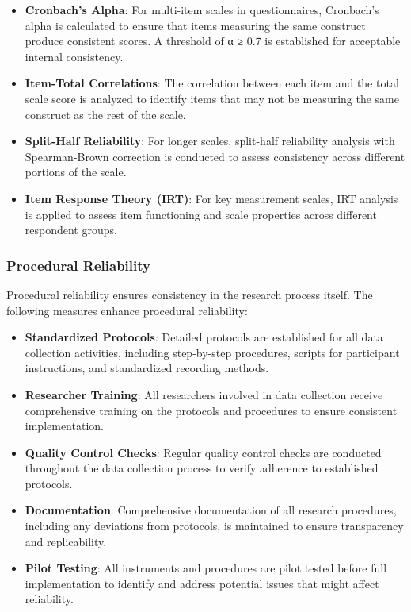 \documentclass[12pt, a4paper, oneside]{book}
\begin{document}
\begin{itemize}[leftmargin=*]
    \item \textbf{Cronbach's Alpha}: For multi-item scales in questionnaires, Cronbach's alpha is calculated to ensure that items measuring the same construct produce consistent scores. A threshold of α ≥ 0.7 is established for acceptable internal consistency.

    \item \textbf{Item-Total Correlations}: The correlation between each item and the total scale score is analyzed to identify items that may not be measuring the same construct as the rest of the scale.

    \item \textbf{Split-Half Reliability}: For longer scales, split-half reliability analysis with Spearman-Brown correction is conducted to assess consistency across different portions of the scale.

    \item \textbf{Item Response Theory (IRT)}: For key measurement scales, IRT analysis is applied to assess item functioning and scale properties across different respondent groups.
\end{itemize}

\subsubsection{Procedural Reliability}
Procedural reliability ensures consistency in the research process itself. The following measures enhance procedural reliability:

\begin{itemize}[leftmargin=*]
    \item \textbf{Standardized Protocols}: Detailed protocols are established for all data collection activities, including step-by-step procedures, scripts for participant instructions, and standardized recording methods.

    \item \textbf{Researcher Training}: All researchers involved in data collection receive comprehensive training on the protocols and procedures to ensure consistent implementation.

    \item \textbf{Quality Control Checks}: Regular quality control checks are conducted throughout the data collection process to verify adherence to established protocols.

    \item \textbf{Documentation}: Comprehensive documentation of all research procedures, including any deviations from protocols, is maintained to ensure transparency and replicability.

    \item \textbf{Pilot Testing}: All instruments and procedures are pilot tested before full implementation to identify and address potential issues that might affect reliability.
\end{itemize}
\end{document}
